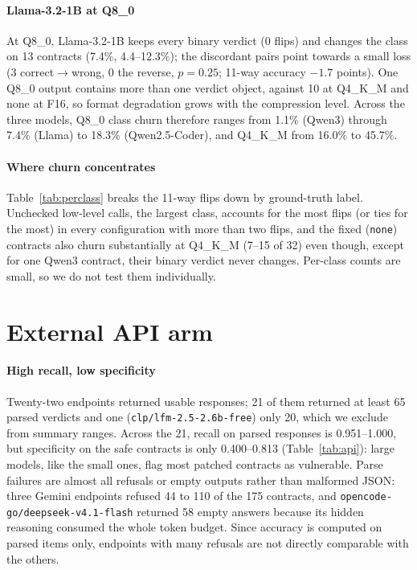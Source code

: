 \paragraph{Llama-3.2-1B at Q8\_0}
At Q8\_0, Llama-3.2-1B keeps every binary verdict (0 flips) and changes the class on 13 contracts (7.4\%, 4.4--12.3\%); the discordant pairs point towards a small loss (3 correct$\to$wrong, 0 the reverse, $p=0.25$; 11-way accuracy $-1.7$ points). One Q8\_0 output contains more than one verdict object, against 10 at Q4\_K\_M and none at F16, so format degradation grows with the compression level. Across the three models, Q8\_0 class churn therefore ranges from 1.1\% (Qwen3) through 7.4\% (Llama) to 18.3\% (Qwen2.5-Coder), and Q4\_K\_M from 16.0\% to 45.7\%.



\paragraph{Where churn concentrates}
Table~\ref{tab:perclass} breaks the 11-way flips down by ground-truth label. Unchecked low-level calls, the largest class, accounts for the most flips (or ties for the most) in every configuration with more than two flips, and the fixed (\texttt{none}) contracts also churn substantially at Q4\_K\_M (7--15 of 32) even though, except for one Qwen3 contract, their binary verdict never changes. Per-class counts are small, so we do not test them individually.

\section{External API arm}\label{sec:api}


\paragraph{High recall, low specificity}
Twenty-two endpoints returned usable responses; 21 of them returned at least 65 parsed verdicts and one (\texttt{clp/lfm-2.5-2.6b-free}) only 20, which we exclude from summary ranges. Across the 21, recall on parsed responses is 0.951--1.000, but specificity on the safe contracts is only 0.400--0.813 (Table~\ref{tab:api}): large models, like the small ones, flag most patched contracts as vulnerable. Parse failures are almost all refusals or empty outputs rather than malformed JSON: three Gemini endpoints refused 44 to 110 of the 175 contracts, and \texttt{opencode-go/deepseek-v4.1-flash} returned 58 empty answers because its hidden reasoning consumed the whole token budget. Since accuracy is computed on parsed items only, endpoints with many refusals are not directly comparable with the others.


